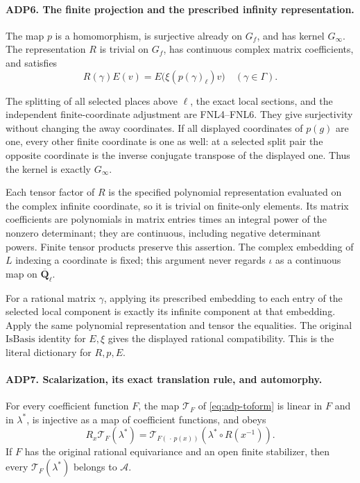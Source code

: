 \documentclass[11pt,a4paper]{article}
\numberwithin{equation}{section}
\theoremstyle{remark}\newtheorem{remark}[theorem]{Remark}
\begin{document}
\paragraph{ADP6. The finite projection and the prescribed infinity representation.}
\label{claim:ADP6}
The map \(p\) is a homomorphism, is surjective already on \(G_f\),
and has kernel \(G_\infty\).  The representation \(R\) is trivial on
\(G_f\), has continuous complex matrix coefficients, and satisfies
\[
 R(\gamma)E(v)=E\bigl(\xi(p(\gamma)_\ell)v\bigr)
                       \quad(\gamma\in\Gamma).
\]

The splitting of all selected places above \(\ell\), the exact local
sections, and the independent finite-coordinate adjustment are FNL4--FNL6.
They give surjectivity without changing the away coordinates.  If all
displayed coordinates of \(p(g)\) are one, every other finite coordinate
is one as well: at a selected split pair the opposite coordinate is the
inverse conjugate transpose of the displayed one.  Thus the kernel is
exactly \(G_\infty\).

Each tensor factor of \(R\) is the specified polynomial representation
evaluated on the complex infinite coordinate, so it is trivial on
finite-only elements.  Its matrix coefficients are polynomials in matrix
entries times an integral power of the nonzero determinant; they are
continuous, including negative determinant powers.  Finite tensor products
preserve this assertion.  The complex embedding of \(L\) indexing a
coordinate is fixed; this argument never regards \(\iota\) as a
continuous map on \(\overline{\mathbf Q}_\ell\).

For a rational matrix \(\gamma\), applying its prescribed embedding
to each entry of the selected local component is exactly its infinite
component at that embedding.  Apply the same polynomial representation
and tensor the equalities.  The original \(\mathrm{IsBasis}\) identity
for \(E,\xi\) gives the displayed rational compatibility.  This is the
literal dictionary for \(R,p,E\).

\paragraph{ADP7. Scalarization, its exact translation rule, and automorphy.}
\label{claim:ADP7}
For every coefficient function \(F\), the map \(\mathcal T_F\) of
\eqref{eq:adp-toform} is linear in \(F\) and in \(\lambda^*\), is
injective as a map of coefficient functions, and obeys
\[
 R_x\mathcal T_F(\lambda^*)
  =\mathcal T_{F(\,\cdot\,p(x))}
                    (\lambda^*\circ R(x^{-1})).
\]
If \(F\) has the original rational equivariance and an open finite
stabilizer, then every \(\mathcal T_F(\lambda^*)\) belongs to
\(\mathcal A\).
\end{document}

